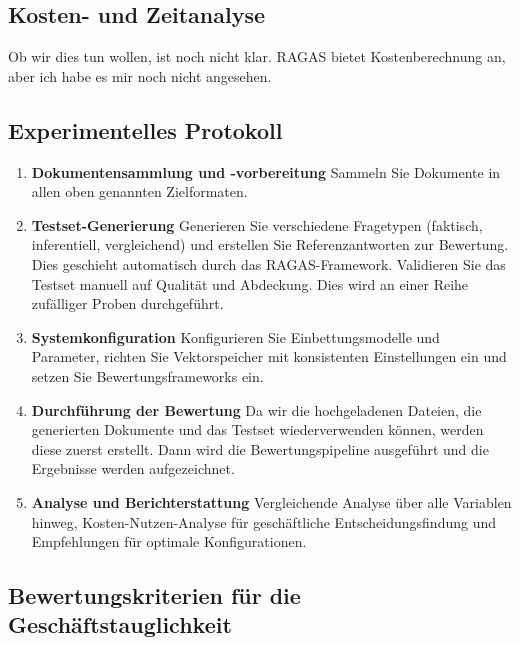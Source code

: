 \subsection{Kosten- und Zeitanalyse}
Ob wir dies tun wollen, ist noch nicht klar. RAGAS bietet Kostenberechnung an, aber ich habe es mir noch nicht angesehen.

\subsection{Experimentelles Protokoll}

\begin{enumerate}
    \item \textbf{Dokumentensammlung und -vorbereitung}
    Sammeln Sie Dokumente in allen oben genannten Zielformaten.
    
    \item \textbf{Testset-Generierung}
    Generieren Sie verschiedene Fragetypen (faktisch, inferentiell, vergleichend) und erstellen Sie Referenzantworten zur Bewertung.
    Dies geschieht automatisch durch das RAGAS-Framework.
    Validieren Sie das Testset manuell auf Qualität und Abdeckung. Dies wird an einer Reihe zufälliger Proben durchgeführt.
    
    
    \item \textbf{Systemkonfiguration}
    Konfigurieren Sie Einbettungsmodelle und Parameter, richten Sie Vektorspeicher mit konsistenten Einstellungen ein und setzen Sie Bewertungsframeworks ein.
    
    \item \textbf{Durchführung der Bewertung}
    Da wir die hochgeladenen Dateien, die generierten Dokumente und das Testset wiederverwenden können, werden diese zuerst erstellt.
    Dann wird die Bewertungspipeline ausgeführt und die Ergebnisse werden aufgezeichnet.
    
    \item \textbf{Analyse und Berichterstattung}
    Vergleichende Analyse über alle Variablen hinweg, Kosten-Nutzen-Analyse für geschäftliche Entscheidungsfindung und Empfehlungen für optimale Konfigurationen.
\end{enumerate}

\subsection{Bewertungskriterien für die Geschäftstauglichkeit}

